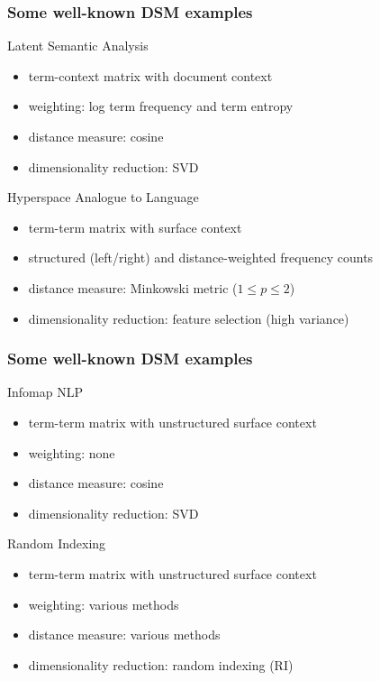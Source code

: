 \documentclass[t]{beamer} %
\begin{document}
\begin{frame}
  \frametitle{Some well-known DSM examples}

  \ungap
  \begin{block} {Latent Semantic Analysis \citep{Landauer:Dumais:97}}
    \begin{itemize}
    \item term-context matrix with document context
    \item weighting: log term frequency and term entropy
    \item distance measure: cosine
    \item dimensionality reduction: SVD
    \end{itemize}
  \end{block}
  
  \pause
  \begin{block} {Hyperspace Analogue to Language \citep{Lund:Burgess:96}}
    \begin{itemize}
    \item term-term matrix with surface context
    \item structured (left/right) and distance-weighted frequency counts
    \item distance measure: Minkowski metric ($1\leq p \leq 2$)
    \item dimensionality reduction: feature selection (high variance)
    \end{itemize}
  \end{block}
\end{frame}

\begin{frame}
  \frametitle{Some well-known DSM examples}

  \ungap
  \begin{block} {Infomap NLP \citep{Widdows:04}}
    \begin{itemize}
    \item term-term matrix with unstructured surface context
    \item weighting: none
    \item distance measure: cosine
    \item dimensionality reduction: SVD
    \end{itemize}
  \end{block}

  \pause
  \begin{block} {Random Indexing \citep{Karlgren:Sahlgren:01}}
    \begin{itemize}
    \item term-term matrix with unstructured surface context
    \item weighting: various methods 
    \item distance measure: various methods
    \item dimensionality reduction: random indexing (RI)
    \end{itemize}
  \end{block}
\end{frame}
\end{document}

